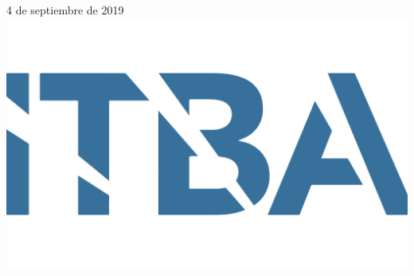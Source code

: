 \begin{titlepage}
    
    
    {\large 4 de septiembre de 2019}\\[1cm] %
    
    
    \includegraphics[scale=0.2]{images/caratula/logo2.png}\\[1cm] %
     
    
    \vfill %
    
    \end{titlepage}